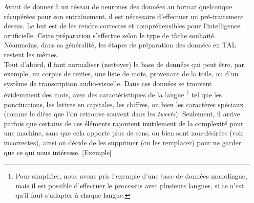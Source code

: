 \documentclass[12pt, french, twoside]{report}
\begin{document}
Avant de donner à un réseau de neurones des données au format quelconque récupérées pour son entraînement, il est nécessaire d'effectuer un pré-traitement dessus. Le but est de les rendre correctes et compréhensibles pour l'intelligence artificielle. Cette préparation s'effectue selon le type de tâche souhaité. Néanmoins, dans sa généralité, les étapes de préparation des données en TAL restent les mêmes.\\

Tout d'abord, il faut normaliser (nettoyer) la base de données qui peut être, par exemple, un corpus de textes, une liste de mots, provenant de la toile, ou d'un système de transcription audio-visuelle. Dans ces données se trouvent évidemment des mots, avec des \og caractéristiques \fg de la langue \footnote{Pour simplifier, nous avons pris l'exemple d'une base de données monolingue, mais il est possible d'effectuer le processus avec plusieurs langues, si ce n'est qu'il faut s'adapter à chaque langue.} tel que les ponctuations, les lettres en capitales, les chiffres, ou bien les caractères spéciaux (comme le dièse que l'on retrouve souvent dans les \textit{tweets}). Seulement, il arrive parfois que certains de ces éléments rajoutent inutilement de la complexité pour une machine, sans que cela apporte plus de sens, ou bien sont non-désirées (voir incorrectes), ainsi on décide de les supprimer (ou les remplacer) pour ne garder que ce qui nous intéresse.\cite{jurafsky_regular} [Exemple]\\
\end{document}
